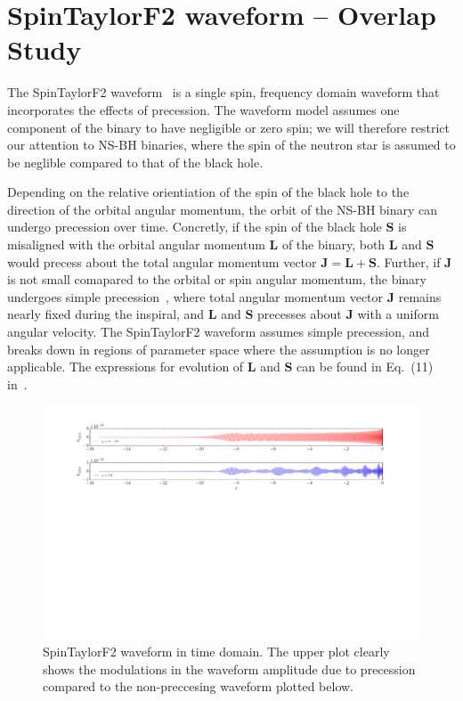 
\chapter{SpinTaylorF2 waveform -- Overlap Study}

The SpinTaylorF2 waveform~\cite{Lundgren2014} is a single spin, frequency domain
waveform that incorporates the effects of precession.  The waveform model
assumes one component of the binary to have negligible or zero spin; we will
therefore restrict our attention to NS-BH binaries, where the spin of the
neutron star is assumed to be neglible compared to that of the black hole.

Depending on the relative orientiation of the spin of the black hole to the
direction of the orbital angular momentum, the orbit of the NS-BH binary can
undergo precession over time. Concretly, if the spin of the black hole
$\mathbf{S}$ is misaligned with the orbital angular momentum $\mathbf{L}$ of the
binary, both $\mathbf{L}$ and $\mathbf{S}$ would precess about the total angular
momentum vector $\mathbf{J} = \mathbf{L} + \mathbf{S}$. Further, if $\mathbf{J}$
is not  small comapared to the orbital or spin angular momentum, the binary
undergoes simple precession~\cite{Apostolatos1994}, where total angular momentum
vector $\mathbf{J}$ remains nearly fixed during the inspiral, and $\mathbf{L}$
and $\mathbf{S}$ precesses about $\mathbf{J}$ with a uniform angular velocity. 
The SpinTaylorF2 waveform assumes simple precession, and breaks down in regions of 
parameter space where the assumption is no longer applicable. The expressions for 
evolution of $\mathbf{L}$ and $\mathbf{S}$ can be found in Eq.~(11) in~\cite{Apostolatos1994}.

\label{wf_compare}
\begin{figure}[t]
\includegraphics[width=\textwidth]{./images/TD_waveforms_comparison.pdf}
\caption{SpinTaylorF2 waveform in time domain. The upper plot clearly shows the modulations in the waveform amplitude due to precession compared 
to the non-preccesing waveform plotted below.}
\centering
\end{figure}

